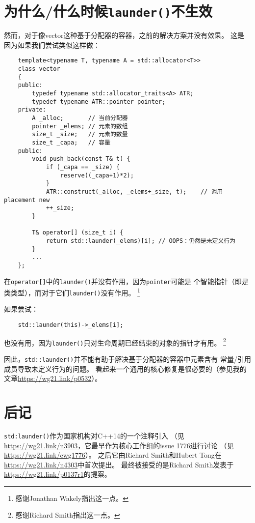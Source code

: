\section{为什么/什么时候\texttt{launder()}不生效}
然而，对于像vector这种基于分配器的容器，之前的解决方案并没有效果。
这是因为如果我们尝试类似这样做：
\begin{lstlisting}
    template<typename T, typename A = std::allocator<T>>
    class vector
    {
    public:
        typedef typename std::allocator_traits<A> ATR;
        typedef typename ATR::pointer pointer;
    private:
        A _alloc;       // 当前分配器
        pointer _elems; // 元素的数组
        size_t _size;   // 元素的数量
        size_t _capa;   // 容量
    public:
        void push_back(const T& t) {
            if (_capa == _size) {
                reserve((_capa+1)*2);
            }
            ATR::construct(_alloc, _elems+_size, t);    // 调用placement new
            ++_size;
        }

        T& operator[] (size_t i) {
            return std::launder(_elems)[i]; // OOPS：仍然是未定义行为
        }
        ...
    };
\end{lstlisting}
在\texttt{operator[]}中的\texttt{launder()}并没有作用，因为\texttt{pointer}可能是
个智能指针（即是类类型），而对于它们\texttt{launder()}没有作用。
\footnote{感谢Jonathan Wakely指出这一点。}

如果尝试：
\begin{lstlisting}
    std::launder(this)->_elems[i];
\end{lstlisting}
也没有用，因为\texttt{launder()}只对生命周期已经结束的对象的指针才有用。
\footnote{感谢Richard Smith指出这一点。}

因此，\texttt{std::launder()}并不能有助于解决基于分配器的容器中元素含有
常量/引用成员导致未定义行为的问题。
看起来一个通用的核心修复是很必要的（参见我的文章\url{https://wg21.link/p0532}）。


\section{后记}
\texttt{std:launder()}作为国家机构对C++14的一个注释引入
（见\url{https://wg21.link/n3903}，它最早作为核心工作组的issue 1776进行讨论
（见\url{https://wg21.link/cwg1776}）。
之后它由Richard Smith和Hubert Tong在\url{https://wg21.link/n4303}中首次提出。
最终被接受的是Richard Smith发表于\url{https://wg21.link/p0137r1}的提案。